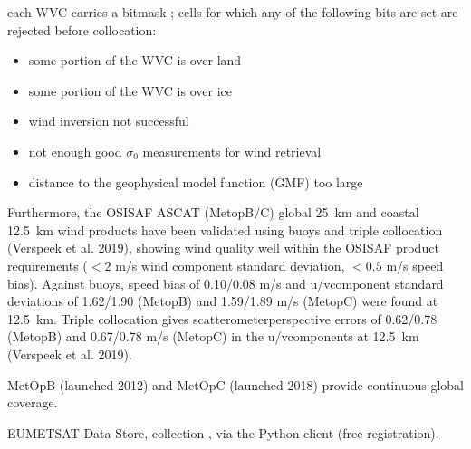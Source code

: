 \documentclass[a4paper,10pt,english]{sphinxmanual}
\begin{document}
\sphinxAtStartPar
{}

\sphinxAtStartPar
each WVC carries a bitmask ; cells for which any of the following bits are set are rejected before collocation:
\begin{itemize}
\item {} 
\sphinxAtStartPar
some portion of the WVC is over land

\item {} 
\sphinxAtStartPar
some portion of the WVC is over ice

\item {} 
\sphinxAtStartPar
wind inversion not successful

\item {} 
\sphinxAtStartPar
not enough good \(\sigma_0\) measurements for wind retrieval

\item {} 
\sphinxAtStartPar
distance to the geophysical model function (GMF) too large

\end{itemize}

\sphinxAtStartPar
Furthermore, the OSI\sphinxhyphen{}SAF ASCAT (Metop\sphinxhyphen{}B/C) global 25 km and coastal 12.5 km wind products have been validated using buoys and triple collocation (Verspeek et al. 2019), showing wind quality well within the OSI\sphinxhyphen{}SAF product requirements (\(<2\) m/s wind component standard deviation, \(<0.5\) m/s speed bias). Against buoys, speed bias of 0.10/0.08 m/s and u\sphinxhyphen{}/v\sphinxhyphen{}component standard deviations of 1.62/1.90 (Metop\sphinxhyphen{}B) and 1.59/1.89 m/s (Metop\sphinxhyphen{}C) were found at 12.5 km. Triple collocation gives scatterometer\sphinxhyphen{}perspective errors of 0.62/0.78 (Metop\sphinxhyphen{}B) and 0.67/0.78 m/s (Metop\sphinxhyphen{}C) in the u\sphinxhyphen{}/v\sphinxhyphen{}components at 12.5 km (Verspeek et al. 2019).

\sphinxAtStartPar
{}

\sphinxAtStartPar
MetOp\sphinxhyphen{}B (launched 2012) and MetOp\sphinxhyphen{}C (launched 2018) provide continuous global coverage.

\sphinxAtStartPar
{}

\sphinxAtStartPar
EUMETSAT Data Store, collection , via the  Python client (free registration).
\end{document}
